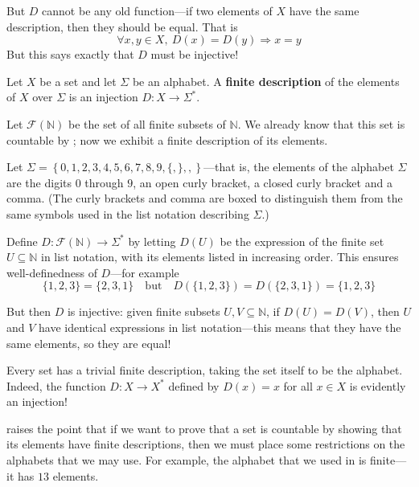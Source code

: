But $D$ cannot be any old function---if two elements of $X$ have the same description, then they should be equal. That is
\[ \forall x,y \in X,~ D(x) = D(y) \Rightarrow x=y \]
But this says exactly that $D$ must be injective!

\begin{definition}
\label{defFiniteDescription}
Let $X$ be a set and let $\Sigma$ be an alphabet. A \textbf{finite description} of the elements of $X$ over $\Sigma$ is an injection $D : X \to \Sigma^*$.
\end{definition}

\begin{example}
\label{exFiniteDescriptionOfFiniteSubsetsOfN}
Let $\mathcal{F}(\mathbb{N})$ be the set of all finite subsets of $\mathbb{N}$. We already know that this set is countable by ; now we exhibit a finite description of its elements.

Let $\Sigma = \left\{ 0,1,2,3,4,5,6,7,8,9,\boxed{\{},\boxed{\}},\boxed{,} \right\}$---that is, the elements of the alphabet $\Sigma$ are the digits $0$ through $9$, an open curly bracket, a closed curly bracket and a comma. (The curly brackets and comma are boxed to distinguish them from the same symbols used in the list notation describing $\Sigma$.)

Define $D : \mathcal{F}(\mathbb{N}) \to \Sigma^*$ by letting $D(U)$ be the expression of the finite set $U \subseteq \mathbb{N}$ in list notation, with its elements listed in increasing order. This ensures well-definedness of $D$---for example
\[ \{1,2,3\} = \{2,3,1\} \quad \text{but} \quad D(\{1,2,3\}) = D(\{2,3,1\}) = \{1,2,3\} \] 

But then $D$ is injective: given finite subsets $U, V \subseteq \mathbb{N}$, if $D(U) = D(V)$, then $U$ and $V$ have identical expressions in list notation---this means that they have the same elements, so they are equal!
\end{example}

\begin{example}
\label{exTrivialFiniteDescription}
Every set has a trivial finite description, taking the set itself to be the alphabet. Indeed, the function $D : X \to X^*$ defined by $D(x) = x$ for all $x \in X$ is evidently an injection!
\end{example}

 raises the point that if we want to prove that a set is countable by showing that its elements have finite descriptions, then we must place some restrictions on the alphabets that we may use. For example, the alphabet that we used in  is finite---it has $13$ elements.

